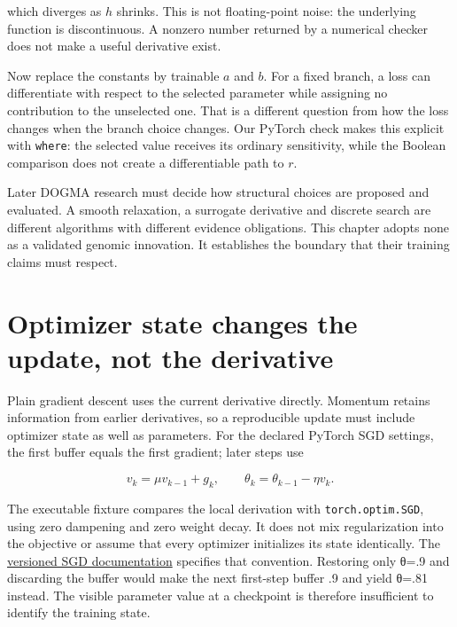 which diverges as \(h\) shrinks. This is not floating-point noise: the
underlying function is discontinuous. A nonzero number returned by a
numerical checker does not make a useful derivative exist.

Now replace the constants by trainable \(a\) and \(b\). For a fixed branch, a
loss can differentiate with respect to the selected parameter while
assigning no contribution to the unselected one. That is a different
question from how the loss changes when the branch choice changes. Our
PyTorch check makes this explicit with \texttt{where}: the selected
value receives its ordinary sensitivity, while the Boolean comparison
does not create a differentiable path to \(r\).

Later DOGMA research must decide how structural choices are proposed and
evaluated. A smooth relaxation, a surrogate derivative and discrete
search are different algorithms with different evidence obligations.
This chapter adopts none as a validated genomic innovation. It
establishes the boundary that their training claims must respect.

\section{Optimizer state changes the update, not the
derivative}\label{optimizer-state-changes-the-update-not-the-derivative}

Plain gradient descent uses the current derivative directly. Momentum
retains information from earlier derivatives, so a reproducible update
must include optimizer state as well as parameters. For the declared
PyTorch SGD settings, the first buffer equals the first gradient; later
steps use

\begin{equation}
v_k=\mu v_{k-1}+g_k,\qquad
\theta_k=\theta_{k-1}-\eta v_k.
\end{equation}


The executable fixture compares the local derivation with
\texttt{torch.optim.SGD}, using zero dampening and zero weight decay. It
does not mix regularization into the objective or assume that every
optimizer initializes its state identically. The
\href{https://docs.pytorch.org/docs/2.10/generated/torch.optim.SGD.html}{versioned
SGD documentation} specifies that convention. Restoring only θ=.9 and
discarding the buffer would make the next first-step buffer .9 and yield
θ=.81 instead. The visible parameter value at a checkpoint is therefore
insufficient to identify the training state.

